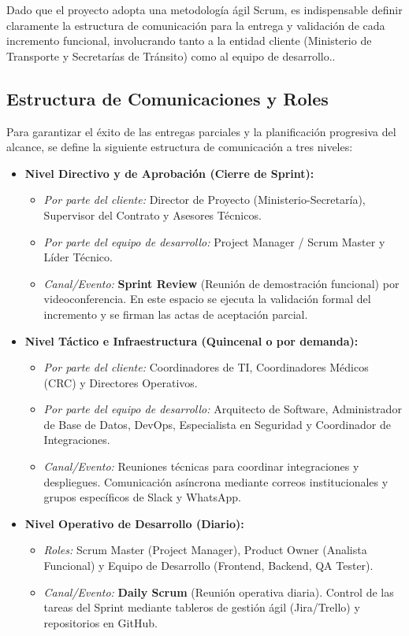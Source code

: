 

Dado que el proyecto adopta una metodología ágil Scrum, es indispensable definir claramente la estructura de comunicación para la entrega y validación de cada incremento funcional, involucrando tanto a la entidad cliente (Ministerio de Transporte y Secretarías de Tránsito) como al equipo de desarrollo..

\subsection{Estructura de Comunicaciones y Roles}

Para garantizar el éxito de las entregas parciales y la planificación progresiva del alcance, se define la siguiente estructura de comunicación a tres niveles:

\begin{itemize}
    \item \textbf{Nivel Directivo y de Aprobación (Cierre de Sprint):} 
    \begin{itemize}
        \item \textit{Por parte del cliente:} Director de Proyecto (Ministerio-Secretaría), Supervisor del Contrato y Asesores Técnicos.
        \item \textit{Por parte del equipo de desarrollo:} Project Manager / Scrum Master y Líder Técnico.
        \item \textit{Canal/Evento:} \textbf{Sprint Review} (Reunión de demostración funcional) por videoconferencia. En este espacio se ejecuta la validación formal del incremento y se firman las actas de aceptación parcial.
    \end{itemize}
    
    \item \textbf{Nivel Táctico e Infraestructura (Quincenal o por demanda):}
    \begin{itemize}
        \item \textit{Por parte del cliente:} Coordinadores de TI, Coordinadores Médicos (CRC) y Directores Operativos.
        \item \textit{Por parte del equipo de desarrollo:} Arquitecto de Software, Administrador de Base de Datos, DevOps, Especialista en Seguridad y Coordinador de Integraciones.
        \item \textit{Canal/Evento:} Reuniones técnicas para coordinar integraciones y despliegues. Comunicación asíncrona mediante correos institucionales y grupos específicos de Slack y WhatsApp.
    \end{itemize}
    
    \item \textbf{Nivel Operativo de Desarrollo (Diario):}
    \begin{itemize}
        \item \textit{Roles:} Scrum Master (Project Manager), Product Owner (Analista Funcional) y Equipo de Desarrollo (Frontend, Backend, QA Tester).
        \item \textit{Canal/Evento:} \textbf{Daily Scrum} (Reunión operativa diaria). Control de las tareas del Sprint mediante tableros de gestión ágil (Jira/Trello) y repositorios en GitHub.
    \end{itemize}
\end{itemize}

